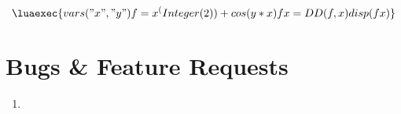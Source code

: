 \documentclass{article}
\begin{document}
\[ \luaexec{
    vars("x","y")
    f = x^(Integer(2))+cos(y*x)
    fx = DD(f,x)
    disp(fx)
} \] 

\newpage



\section{Bugs \& Feature Requests}
{\color{gray} 
\begin{enumerate}
\item 
\end{enumerate}
}
\end{document}
